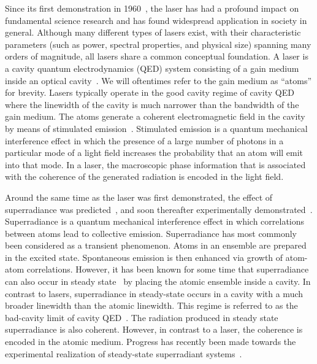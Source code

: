 \documentclass[aps,
twocolumn,
showpacs,
superscriptaddress,groupedaddress]{revtex4}
\begin{document}
Since its first demonstration in 1960~\cite{maiman1960stimulated}, the
laser has had a profound impact on fundamental science research and
has found widespread application in society in general.  Although many
different types of lasers exist, with their characteristic parameters
(such as power, spectral properties, and physical size) spanning many
orders of magnitude, all lasers share a common conceptual foundation.
A laser is a cavity quantum electrodynamics (QED) system consisting of
a gain medium inside an optical cavity~\cite{meystre2007elements}.  We
will oftentimes refer to the gain medium as ``atoms'' for brevity.
Lasers typically operate in the good cavity regime of cavity QED where
the linewidth of the cavity is much narrower than the bandwidth of the
gain medium.  The atoms generate a coherent electromagnetic field in
the cavity by means of stimulated emission~\cite{PhysRev.112.1940}.
Stimulated emission is a quantum mechanical interference effect in
which the presence of a large number of photons in a particular mode
of a light field increases the probability that an atom will emit into
that mode. In a laser, the macroscopic phase information that is
associated with the coherence of the generated radiation is encoded in
the light field.

Around the same time as the laser was first demonstrated, the effect
of superradiance was predicted~\cite{PhysRev.93.99}, and soon
thereafter experimentally demonstrated~\cite{harocheSuperradiance}.
Superradiance is a quantum mechanical interference effect in which
correlations between atoms lead to collective emission.  Superradiance
has most commonly been considered as a transient phenomenon.  Atoms in
an ensemble are prepared in the excited state.  Spontaneous emission
is then enhanced via growth of atom-atom correlations.  However, it
has been known for some time that superradiance can also occur in
steady state~\cite{PhysRevLett.102.163601, PhysRevA.81.033847,
  PhysRevA.81.063827,PhysRevLett.89.253003} by placing the atomic
ensemble inside a cavity.  In contrast to lasers, superradiance in
steady-state occurs in a cavity with a much broader linewidth than the
atomic linewidth.  This regime is referred to as the bad-cavity limit
of cavity QED~\cite{PhysRevA.51.809, PhysRevLett.72.3815,
  ChenDeliciousLaser, HakenLaser, HakenLaserBook}.  The radiation
produced in steady state superradiance is also coherent.  However, in
contrast to a laser, the coherence is encoded in the atomic medium.
Progress has recently been made towards the experimental realization
of steady-state superradiant
systems~\cite{ThompsonPaper,bohnet2012relaxation}.
\end{document}
